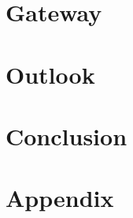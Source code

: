 \documentclass[12pt,a4paper]{article}
\begin{document}

\section{Gateway}


%
%
\section{Outlook}

%
%
\section{Conclusion}

\section{Appendix}






\end{document}
